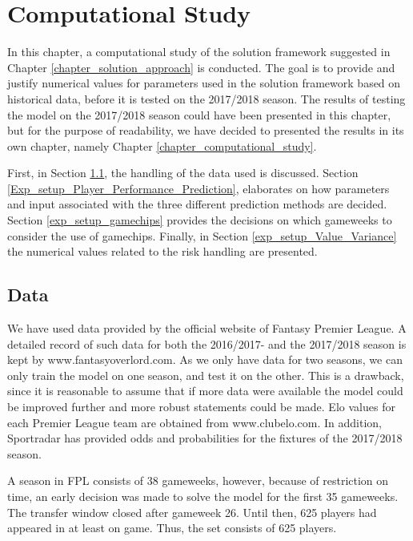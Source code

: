 \chapter{Computational Study}\label{chapter_experimental_setup}


In this chapter, a computational study of the solution framework suggested in Chapter \ref{chapter_solution_approach} is conducted. The goal is to provide and justify numerical values for parameters used in the solution framework based on historical data, before it is tested on the 2017/2018 season. The results of testing the model on the 2017/2018 season could have been presented in this chapter, but for the purpose of readability, we have decided to presented the results in its own chapter, namely Chapter \ref{chapter_computational_study}.

\newpar

First, in Section \ref{exp_setup_data}, the handling of the data used is discussed. Section \ref{Exp_setup_Player_Performance_Prediction}, elaborates on how parameters and input associated with the three different prediction methods are decided. Section \ref{exp_setup_gamechips} provides the decisions on which gameweeks to consider the use of gamechips. Finally, in Section \ref{exp_setup_Value_Variance} the numerical values related to the risk handling are presented.

\section{Data} \label{exp_setup_data}
We have used data provided by the official website of Fantasy Premier League. A detailed record of such data for both the 2016/2017- and the 2017/2018 season is kept by www.fantasyoverlord.com. As we only have data for two seasons, we can only train the model on one season, and test it on the other. This is a drawback, since it is reasonable to assume that if more data were available the model could be improved further and more robust statements could be made. Elo values for each Premier League team are obtained from www.clubelo.com. In addition, Sportradar has provided odds and probabilities for the fixtures of the 2017/2018 season. 

\newpar

A season in FPL consists of 38 gameweeks, however, because of restriction on time, an early decision was made to solve the model for the first 35 gameweeks. The transfer window closed after gameweek 26. Until then, 625 players had appeared in at least on game. Thus, the set consists of 625 players.

